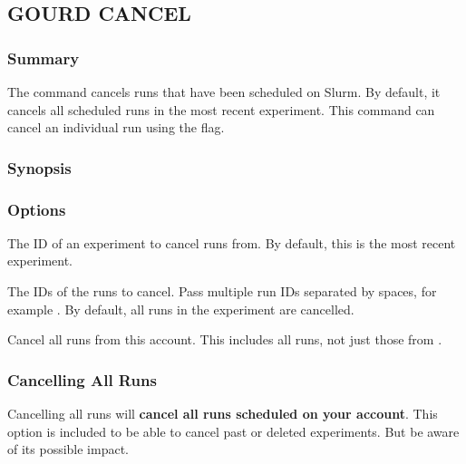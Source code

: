 \documentclass[a4paper,english]{article}
\begin{document}
\begin{adjustwidth}{18pt}{0pt}
        \subsection{GOURD CANCEL}

            \subsubsection{Summary}
                The   command cancels runs that have been scheduled on Slurm.
                By default, it cancels all scheduled runs in the most recent experiment.
                This command can cancel an individual run using the  flag.

            \subsubsection{Synopsis}
                 

            \subsubsection{Options}
                \begin{Description}[Options]
                  \item[\Arg{experiment-id}]
                    The ID of an experiment to cancel runs from.
                    By default, this is the most recent experiment.
                  \item[\OptArg{-i}{ run-ids}]
                    The IDs of the runs to cancel.
                    Pass multiple run IDs separated by spaces, for example .
                    By default, all runs in the experiment are cancelled.
                  \item[\Opt{-a, \ddash all}]
                    Cancel all runs from this account.
                    This includes all runs, not just those from .
                \end{Description}

            \subsubsection{Cancelling All Runs}
                Cancelling all runs will \textbf{cancel all runs scheduled on your account}.
                This option is included to be able to cancel past or deleted experiments.
                But be aware of its possible impact.


\end{adjustwidth}
\end{document}
